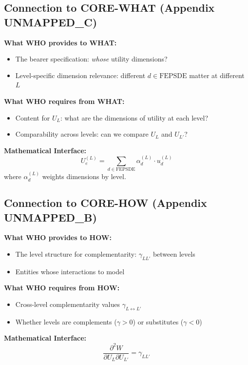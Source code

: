 \subsection{Connection to CORE-WHAT (Appendix UNMAPPED_C)}

\begin{tcolorbox}[colback=yellow!5!white, colframe=yellow!75!black,
    title=Integration: CORE-WHO $\leftrightarrow$ CORE-WHAT]
\textbf{What WHO provides to WHAT:}
\begin{itemize}[nosep]
\item The bearer specification: \textit{whose} utility dimensions?
\item Level-specific dimension relevance: different $d \in \text{FEPSDE}$ matter at different $L$
\end{itemize}

\textbf{What WHO requires from WHAT:}
\begin{itemize}[nosep]
\item Content for $U_L$: what are the dimensions of utility at each level?
\item Comparability across levels: can we compare $U_L$ and $U_{L'}$?
\end{itemize}

\textbf{Mathematical Interface:}
\begin{equation}
U_e^{(L)} = \sum_{d \in \text{FEPSDE}} \alpha_d^{(L)} \cdot u_d^{(L)}
\end{equation}
where $\alpha_d^{(L)}$ weights dimensions by level.
\end{tcolorbox}

\subsection{Connection to CORE-HOW (Appendix UNMAPPED_B)}

\begin{tcolorbox}[colback=yellow!5!white, colframe=yellow!75!black,
    title=Integration: CORE-WHO $\leftrightarrow$ CORE-HOW]
\textbf{What WHO provides to HOW:}
\begin{itemize}[nosep]
\item The level structure for complementarity: $\gamma_{LL'}$ between levels
\item Entities whose interactions to model
\end{itemize}

\textbf{What WHO requires from HOW:}
\begin{itemize}[nosep]
\item Cross-level complementarity values $\gamma_{L \leftrightarrow L'}$
\item Whether levels are complements ($\gamma > 0$) or substitutes ($\gamma < 0$)
\end{itemize}

\textbf{Mathematical Interface:}
\begin{equation}
\frac{\partial^2 W}{\partial U_L \partial U_{L'}} = \gamma_{LL'}
\end{equation}
\end{tcolorbox}

